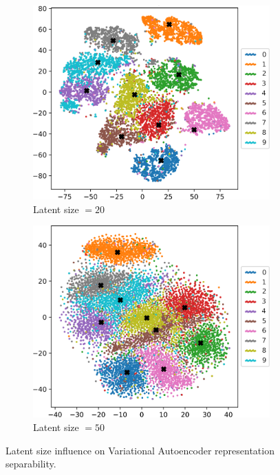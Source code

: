 \begin{figure}[]
     \par\bigskip
     \begin{subfigure}[b]{0.47\textwidth}
         \centering
         \includegraphics[width=\textwidth]{observational/img/vae/vae_TSNE_ls20.png}
         \caption{Latent size $=20$}
     \end{subfigure}
     \hfill
     \begin{subfigure}[b]{0.47\textwidth}
         \centering
         \includegraphics[width=\textwidth]{observational/img/vae/vae_TSNE_ls50.png}
         \caption{Latent size $=50$}
     \end{subfigure} 
     \caption[Latent size influence on VAE representation separability]{Latent size influence on Variational Autoencoder representation separability.}
    \label{fig:vae-tsne-latent}
\end{figure}
